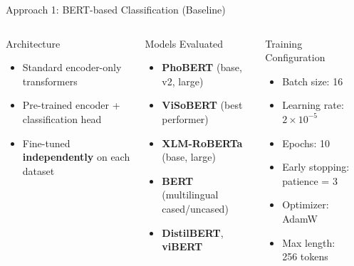 \documentclass[10pt, aspectratio=169]{beamer}
\begin{document}
\begin{frame}[shrink=10]{Approach 1: BERT-based Classification (Baseline)}
  \begin{columns}[T]
    \begin{block}{Architecture}
      \begin{itemize}
        \item Standard encoder-only transformers
        \item Pre-trained encoder + classification head
        \item Fine-tuned \textbf{independently} on each dataset
      \end{itemize}
    \end{block}
    \vspace{0.2cm}
    \begin{exampleblock}{Models Evaluated}
      \begin{itemize}
        \item \textbf{PhoBERT} (base, v2, large)
        \item \textbf{ViSoBERT} (best performer)
        \item \textbf{XLM-RoBERTa} (base, large)
        \item \textbf{BERT} (multilingual cased/uncased)
        \item \textbf{DistilBERT}, \textbf{viBERT}
      \end{itemize}
    \end{exampleblock}

    \begin{block}{Training Configuration}
      \begin{itemize}
        \item Batch size: 16
        \item Learning rate: $2 \times 10^{-5}$
        \item Epochs: 10
        \item Early stopping: patience = 3
        \item Optimizer: AdamW
        \item Max length: 256 tokens
      \end{itemize}
    \end{block}
    \vspace{0.2cm}
    \begin{center}
    \end{center}
  \end{columns}
\end{frame}
\end{document}
